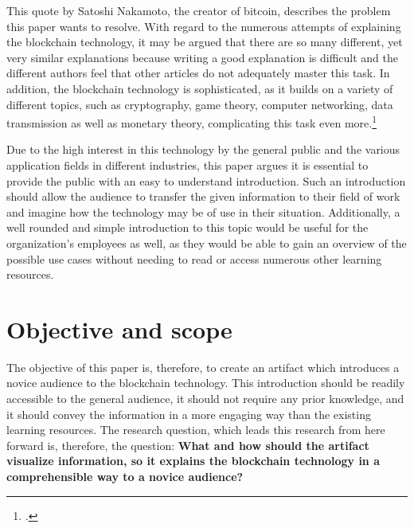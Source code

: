 This quote by Satoshi Nakamoto, the creator of bitcoin, describes the problem this paper wants to resolve. 
With regard to the numerous attempts of explaining the blockchain technology, it may be argued that there are so many different, yet very similar explanations because writing a good explanation is difficult and the different authors feel that other articles do not adequately master this task. In addition, the blockchain technology is sophisticated, as it builds on a variety of different topics, such as cryptography, game theory, computer networking, data transmission as well as monetary theory, complicating this task even more.\footcite[Cf.][]{LoppNobodyUnderstandsBitcoin2017} 

Due to the high interest in this technology by the general public and the various application fields in different industries, this paper argues it is essential to provide the public with an easy to understand introduction. Such an introduction should allow the audience to transfer the given information to their field of work and imagine how the technology may be of use in their situation. %
Additionally, a well rounded and simple introduction to this topic would be useful for the organization's employees as well, as they would be able to gain an overview of the possible use cases without needing to read or access numerous other learning resources.

\section{Objective and scope} \label{sec:Objective}

The objective of this paper is, therefore, to create an artifact which introduces a novice audience to the blockchain technology. This introduction should be readily accessible to the general audience, it should not require any prior knowledge, and it should convey the information in a more engaging way than the existing learning resources. The research question, which leads this research from here forward is, therefore, the question: \textbf{What and how should the artifact visualize information, so it explains the blockchain technology in a comprehensible way to a novice audience?}

